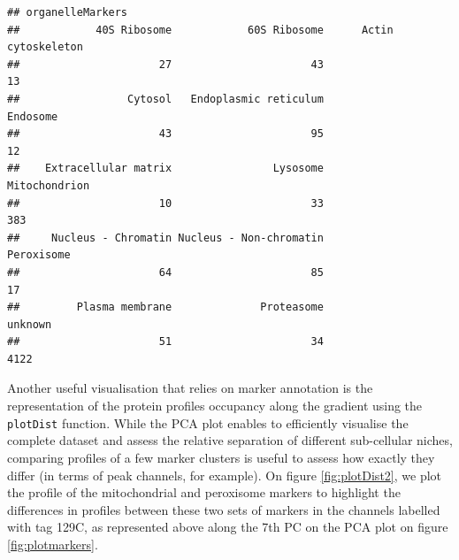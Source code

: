 \begin{knitrout}
\color{fgcolor}\begin{kframe}
\begin{alltt}
 \hlkwb{<-}   \hlstd{=} \hlstd{,}  \hlstd{=} \hlstd{)}
\end{alltt}
\begin{verbatim}
## organelleMarkers
##            40S Ribosome            60S Ribosome      Actin cytoskeleton 
##                      27                      43                      13 
##                 Cytosol   Endoplasmic reticulum                Endosome 
##                      43                      95                      12 
##    Extracellular matrix                Lysosome           Mitochondrion 
##                      10                      33                     383 
##     Nucleus - Chromatin Nucleus - Non-chromatin              Peroxisome 
##                      64                      85                      17 
##         Plasma membrane              Proteasome                 unknown 
##                      51                      34                    4122
\end{verbatim}
\end{kframe}
\end{knitrout}


Another useful visualisation that relies on marker annotation is the
representation of the protein profiles occupancy along the gradient
using the \texttt{plotDist} function. While the PCA plot enables to
efficiently visualise the complete dataset and assess the relative
separation of different sub-cellular niches, comparing profiles of a
few marker clusters is useful to assess how exactly they differ (in
terms of peak channels, for example). On figure \ref{fig:plotDist2},
we plot the profile of the mitochondrial and peroxisome markers to
highlight the differences in profiles between these two sets of
markers in the channels labelled with tag 129C, as represented above
along the 7th PC on the PCA plot on figure \ref{fig:plotmarkers}.

